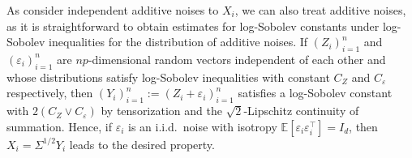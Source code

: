 \documentclass[11pt,a4paper]{article}
\theoremstyle{remark}
\theoremstyle{definition}
\newcommand{\bX}{X}
\newcommand{\bY}{Y}
\newcommand{\bZ}{Z}
\newcommand{\bepsilon}{\epsilon}
\newcommand{\bfI}{I}
\newcommand{\bSigma}{\Sigma}
\newcommand{\E}{\mathbb{E}}
\renewcommand{\epsilon}{\varepsilon}
\theoremstyle{definition}
\begin{document}
\begin{bibunit}[apalike]
As \citet{nakakita2024dimension} consider independent additive noises to $\bX_{i}$, we can also treat additive noises, as it is straightforward to obtain estimates for log-Sobolev constants under log-Sobolev inequalities for the distribution of additive noises.
If $(\bZ_{i})_{i=1}^{n}$ and $(\bepsilon_{i})_{i=1}^{n}$ are $np$-dimensional random vectors independent of each other and whose distributions satisfy log-Sobolev inequalities with constant $C_{\bZ}$ and $C_{\bepsilon}$ respectively, then $(\bY_{i})_{i=1}^{n}:=(\bZ_{i}+\bepsilon_{i})_{i=1}^{n}$ satisfies a log-Sobolev constant with $2(C_{\bZ}\vee C_{\bepsilon})$ by tensorization \citep{bakry2014analysis} and the $\sqrt{2}$-Lipschitz continuity of summation.
Hence, if $\bepsilon_{i}$ is an i.i.d.~noise with isotropy $\E[\bepsilon_{i}\bepsilon_{i}^{\top}]=\bfI_{d}$, then $\bX_{i}=\bSigma^{1/2}\bY_{i}$ leads to the desired property.


\end{bibunit}
\end{document}
